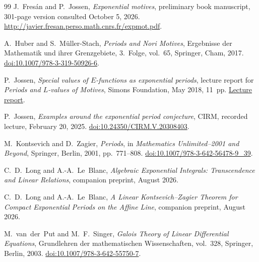 \documentclass[11pt]{article}
\numberwithin{equation}{section}
\theoremstyle{definition}
\theoremstyle{remark}
\begin{document}
\begin{thebibliography}{99}
J.~Fres\'an and P.~Jossen,
\emph{Exponential motives},
preliminary book manuscript, 301-page version consulted October 5, 2026.
\url{http://javier.fresan.perso.math.cnrs.fr/expmot.pdf}.

A.~Huber and S.~M\"uller-Stach,
\emph{Periods and Nori Motives},
Ergebnisse der Mathematik und ihrer Grenzgebiete, 3.~Folge, vol.~65,
Springer, Cham, 2017.
\href{https://doi.org/10.1007/978-3-319-50926-6}{doi:10.1007/978-3-319-50926-6}.

P.~Jossen,
\emph{Special values of $E$-functions as exponential periods},
lecture report for \emph{Periods and $L$-values of Motives},
Simons Foundation, May 2018, 11~pp.
\href{https://simonsfoundation.s3.amazonaws.com/share/mps/symposia/2018/pdf/palvom/Report_Jossen.pdf}{Lecture report}.

P.~Jossen,
\emph{Examples around the exponential period conjecture},
CIRM, recorded lecture, February 20, 2025.
\href{https://doi.org/10.24350/CIRM.V.20308403}{doi:10.24350/CIRM.V.20308403}.

M.~Kontsevich and D.~Zagier,
\emph{Periods},
in \emph{Mathematics Unlimited--2001 and Beyond},
Springer, Berlin, 2001, pp.~771--808.
\href{https://doi.org/10.1007/978-3-642-56478-9_39}{doi:10.1007/978-3-642-56478-9\_39}.

C.~D.~Long and A.-A.~Le~Blanc,
\emph{Algebraic Exponential Integrals: Transcendence and Linear Relations},
companion preprint, August 2026.

C.~D.~Long and A.-A.~Le~Blanc,
\emph{A Linear Kontsevich--Zagier Theorem for Compact Exponential Periods on
the Affine Line},
companion preprint, August 2026.

M.~van~der~Put and M.~F.~Singer,
\emph{Galois Theory of Linear Differential Equations},
Grundlehren der mathematischen Wissenschaften, vol.~328,
Springer, Berlin, 2003.
\href{https://doi.org/10.1007/978-3-642-55750-7}{doi:10.1007/978-3-642-55750-7}.

\end{thebibliography}
\end{document}
